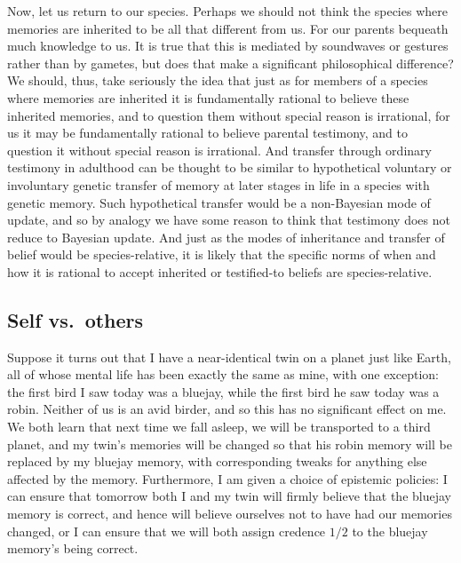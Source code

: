 Now, let us return to our species. Perhaps we should not think the species where memories are inherited to be all that
different from us. For our parents bequeath much knowledge to us. It is true that this is mediated by soundwaves or gestures rather than by gametes, but does that make a significant philosophical difference? We should, thus, take seriously the idea
that just as for members of a species where memories are inherited it is fundamentally rational to believe these inherited
memories, and to question them without special reason is irrational, for us it may be fundamentally rational to believe
parental testimony, and to question it without special reason is irrational. And transfer through ordinary 
testimony in adulthood can be thought to be similar to hypothetical voluntary or involuntary genetic transfer of
memory at later stages in life in a species with genetic memory. Such hypothetical transfer would be a non-Bayesian mode of update, and so by analogy we have some reason to think
that testimony does not reduce to Bayesian update. And just as the modes of inheritance and transfer
of belief would be species-relative, it is likely that the specific norms of when and how it is rational to accept inherited 
or testified-to beliefs are species-relative. 

\subsection{Self vs.\ others}
Suppose it turns out that I have a near-identical twin on a planet just like Earth, all of whose mental life has been exactly 
the same as mine, with one exception: the first bird I saw today was a bluejay, while the first bird he saw today was a robin. 
Neither of us is an avid birder, and so this has no significant effect on me. We both learn that next time we fall asleep, we 
will be transported to a third planet, and my twin's memories will be changed so that his robin memory will be replaced by my
bluejay memory, with corresponding tweaks for anything else affected by the memory. Furthermore, I am given a choice of epistemic
policies: I can ensure that tomorrow both I and my twin will firmly believe that the bluejay memory is correct, and hence will 
believe ourselves not to have had our memories changed, or I can ensure that we will both assign credence $1/2$ to the bluejay 
memory's being correct. 

